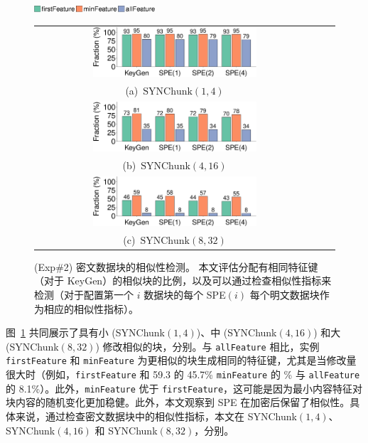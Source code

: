 \begin{figure}[t]
    \centering
    \includegraphics[width=0.4\textwidth]{pic/featurespy/plot/detection/syn/synBarPlotDetect_legend.pdf}\\
    \begin{tabular}{@{}c@{}c@{}c}
        \includegraphics[width=0.6\textwidth]{pic/featurespy/plot/detection/syn/syn-p1-q4-detect.pdf} \\
        \mbox{\small (a) $\textrm{SYNChunk}(1, 4)$}\\
        \includegraphics[width=0.6\textwidth]{pic/featurespy/plot/detection/syn/syn-p4-q16-detect.pdf} \\
        \mbox{\small (b) $\textrm{SYNChunk}(4, 16)$}\\
        \includegraphics[width=0.6\textwidth]{pic/featurespy/plot/detection/syn/syn-p8-q32-detect.pdf}\\
        \mbox{\small (c) $\textrm{SYNChunk}(8, 32)$}\\
    \end{tabular}
    \vspace{-6pt}
    \caption{(Exp\#2) 密文数据块的相似性检测。 本文评估分配有相同特征键（对于 KeyGen）的相似块的比例，以及可以通过检查相似性指标来检测（对于配置第一个 $i$ 数据块的每个 SPE$(i)$ 每个明文数据块作为相应的相似性指标）。}
    \vspace{-6pt}
    \label{fig:featurespy-expDetectionSynDetect}
\end{figure}

图~\ref{fig:featurespy-expDetectionSynDetect} 共同展示了具有小 (SYNChunk$(1, 4)$)、中 (SYNChunk$(4, 16)$) 和大 (SYNChunk$(8, 32)$) 修改相似的块，分别。与 {\tt allFeature} 相比，实例 {\tt firstFeature} 和 {\tt minFeature} 为更相似的块生成相同的特征键，尤其是当修改量很大时（例如，{\tt firstFeature} 和 59.3 的 45.7\% {\tt minFeature} 的 \% 与 {\tt allFeature} 的 8.1\%）。此外，{\tt minFeature} 优于 {\tt firstFeature}，这可能是因为最小内容特征对块内容的随机变化更加稳健。此外，本文观察到 SPE 在加密后保留了相似性。具体来说，通过检查密文数据块中的相似性指标，本文在 SYNChunk$(1, 4)$、SYNChunk$(4, 16)$ 和 SYNChunk$( 8, 32)$，分别。


